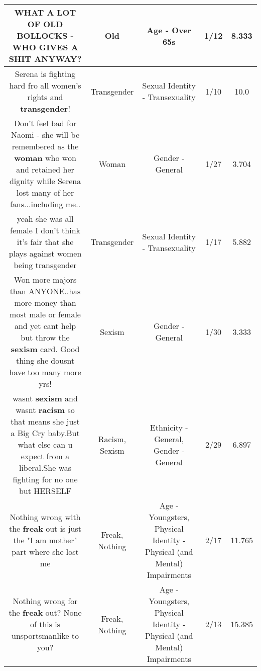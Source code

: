 \documentclass[11pt]{article}
\newlength\mylength
\begin{document}
\begin{center}
\begin{longtable}{|C{.65\mylength}|C{.30\mylength}|C{.12\mylength}|C{.12\mylength}|C{.12\mylength}|}
  \small WHAT A LOT OF \textbf{OLD} BOLLOCKS - WHO GIVES A SHIT ANYWAY?\normalsize   & Old & Age - Over 65s & 1/12 & 8.333 \\  \hline
  \small Serena is fighting hard fro all women's rights and \textbf{transgender}!\normalsize   & Transgender & Sexual Identity - Transexuality & 1/10 & 10.0 \\  \hline
  \small Don't feel bad for Naomi - she will be remembered as the \textbf{woman} who won and retained her dignity while Serena lost many of her fans...including me..\normalsize   & Woman & Gender - General & 1/27 & 3.704 \\  \hline
  \small yeah she was all female I don't think it's fair that she plays against women being transgender\normalsize   & Transgender & Sexual Identity - Transexuality & 1/17 & 5.882 \\  \hline
  \small Won more majors than ANYONE..has more money than most male or female and yet cant help but throw the \textbf{sexism} card. Good thing she dousnt have too many more yrs!\normalsize   & Sexism & Gender - General & 1/30 & 3.333 \\  \hline
  \small wasnt \textbf{sexism} and wasnt \textbf{racism} so that means she just a Big Cry baby.But what else can u expect from a liberal.She was fighting for no one but HERSELF\normalsize   & Racism, Sexism & Ethnicity - General, Gender - General & 2/29 & 6.897 \\  \hline
  \small Nothing wrong with the \textbf{freak} out is just the "I am mother" part where she lost me\normalsize   & Freak, Nothing & Age - Youngsters, Physical Identity - Physical (and Mental) Impairments & 2/17 & 11.765 \\  \hline
  \small Nothing wrong for the \textbf{freak} out? None of this is unsportsmanlike to you?\normalsize   & Freak, Nothing & Age - Youngsters, Physical Identity - Physical (and Mental) Impairments & 2/13 & 15.385 \\  \hline

\end{longtable}
\end{center}
\end{document}
